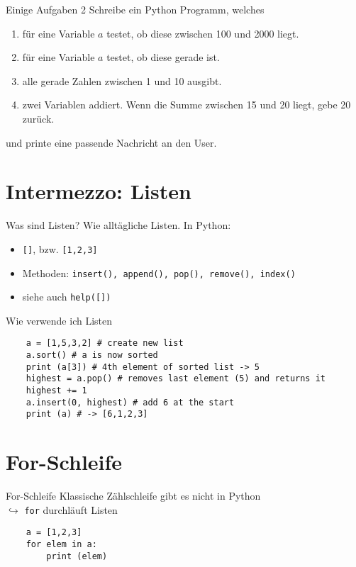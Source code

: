 \begin{frame}{Einige Aufgaben 2}
	Schreibe ein Python Programm, welches
	\begin{enumerate}
		\item für eine Variable $a$ testet, ob diese zwischen 100 und 2000 liegt.
		\item für eine Variable $a$ testet, ob diese gerade ist.
		\item alle gerade Zahlen zwischen 1 und 10 ausgibt.
		\item zwei Variablen addiert. Wenn die Summe zwischen 15 und 20 liegt, gebe 20 zurück.
	\end{enumerate}
	und printe eine passende Nachricht an den User.
\end{frame}

\section{Intermezzo: Listen}

\begin{frame}{Was sind Listen?}
    Wie alltägliche Listen. In Python:
    \begin{itemize}
        \item \texttt{[]}, bzw. \texttt{[1,2,3]}
        \item Methoden: \texttt{insert(), append(), pop(), remove(), index()}
        \item siehe auch \texttt{help([])}
    \end{itemize}
\end{frame}

\begin{frame}[fragile]{Wie verwende ich Listen}
    \begin{lstlisting}
    a = [1,5,3,2] # create new list
    a.sort() # a is now sorted
    print (a[3]) # 4th element of sorted list -> 5
    highest = a.pop() # removes last element (5) and returns it
    highest += 1
    a.insert(0, highest) # add 6 at the start
    print (a) # -> [6,1,2,3]
    \end{lstlisting}
\end{frame}

\section{For-Schleife}

\begin{frame}[fragile]{For-Schleife}
    Klassische Zählschleife gibt es nicht in Python\\
    $\hookrightarrow$ \texttt{for} durchläuft Listen
    \begin{lstlisting}
    a = [1,2,3]
    for elem in a:
        print (elem)
    \end{lstlisting}
\end{frame}

